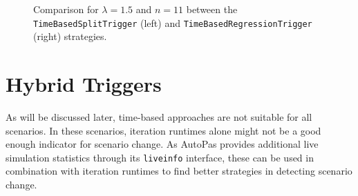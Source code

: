 \begin{figure}[htpb]
\begin{subfigure}{0.5\textwidth}
	\end{subfigure}
	\caption{Comparison for $\lambda=1.5$ and $n=11$ between the \texttt{TimeBasedSplitTrigger} (left) and \texttt{TimeBasedRegressionTrigger} (right) strategies.}
	\label{fig:split_vs_regression}
\end{figure}

\section{Hybrid Triggers}
As will be discussed later, time-based approaches are not suitable for all scenarios. In these scenarios, iteration runtimes alone might not be a good enough indicator for scenario change. As AutoPas provides additional live simulation statistics through its \texttt{liveinfo} interface, these can be used in combination with iteration runtimes to find better strategies in detecting scenario change.


